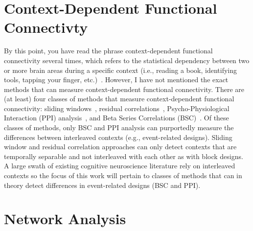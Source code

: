 \documentclass[phd,appendix,figures]{uithesis}
\begin{document}
\section{Context-Dependent Functional Connectivty}

By this point, you have read the phrase context-dependent functional connectivity several times,
which refers to the statistical dependency between two or more brain areas during a specific context
(i.e., reading a book, identifying tools, tapping your finger, etc.)~\cite{Friston1997}.
However, I have not mentioned the exact methods that can measure context-dependent functional connectivity.
There are (at least) four classes of methods that measure context-dependent functional connectivity:
sliding windows~\cite{Shine2015}, residual correlations~\cite{Cole2014a},
Psycho-Physiological Interaction (PPI) analysis~\cite{Friston1997}, and Beta Series Correlations (BSC)~\cite{Rissman2004}.
Of these classes of methods, only BSC and PPI analysis can purportedly measure the differences
between interleaved contexts (e.g., event-related designs).
Sliding window and residual correlation approaches can only detect contexts that are
temporally separable and not interleaved with each other as with block designs.
A large swath of existing cognitive neuroscience literature rely on interleaved
contexts so the focus of this work will pertain to classes of methods
that can in theory detect differences in event-related designs (BSC and PPI).

\section{Network Analysis}
\end{document}
